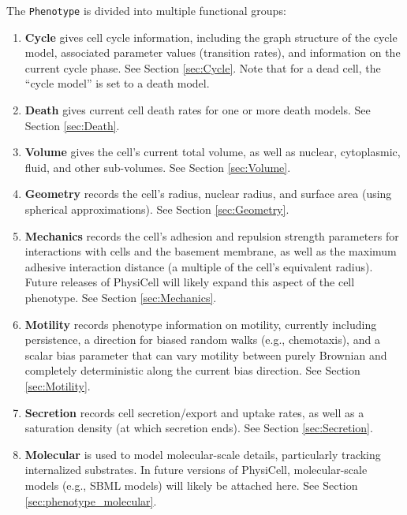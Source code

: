\documentclass[12pt]{article}
\renewcommand{\v}{\verb}
\begin{document}
The \v|Phenotype| is divided into multiple functional groups: 
\begin{enumerate}
\item 
\textbf{Cycle} gives cell cycle information, including the graph structure of the 
cycle model, associated parameter values (transition rates), and information 
on the current cycle phase. See Section \ref{sec:Cycle}. 
Note that for a dead cell, the ``cycle model'' 
is set to a death model. 

\item 
\textbf{Death} gives current cell death rates for one or more 
death models. See Section \ref{sec:Death}. 

\item 
\textbf{Volume} gives the cell's current total volume, as well as nuclear, cytoplasmic, 
fluid, and other sub-volumes. See Section \ref{sec:Volume}.

\item 
\textbf{Geometry} records the cell's radius, nuclear radius, and surface area (using 
spherical approximations).  See Section \ref{sec:Geometry}.

\item
\textbf{Mechanics} records the cell's adhesion and repulsion strength parameters for 
interactions with cells and the basement membrane, as well as 
the maximum adhesive interaction distance (a multiple of the cell's equivalent radius). 
Future releases of PhysiCell will likely expand this aspect of the cell phenotype. 
See Section \ref{sec:Mechanics}.

\item
\textbf{Motility} records phenotype information on motility, currently including 
persistence, a direction for biased random walks (e.g., chemotaxis), and a 
scalar bias parameter that can vary motility between purely Brownian and 
completely deterministic along the current bias direction. See Section \ref{sec:Motility}. 

\item 
\textbf{Secretion} records cell secretion/export and uptake rates, as well as a 
saturation density (at which secretion ends). See Section \ref{sec:Secretion}. 

\item 
\textbf{Molecular} is used to model molecular-scale details, particularly 
tracking internalized substrates. In future versions of PhysiCell, molecular-scale 
models (e.g., SBML models) will likely be attached here. See Section \ref{sec:phenotype_molecular}. 

\end{enumerate}
\end{document}

